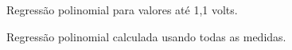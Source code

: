 \documentclass[brazilian,12pt,a4paper,final]{article}
\begin{document}
\begin{figure}[htbp!]
  \caption{Regressão polinomial para valores até 1,1 volts.}
  \label{figiniciopeq}
  \centering
\end{figure}

\begin{figure}[htbp!]
  \caption{Regressão polinomial calculada usando todas as medidas.}
  \label{figiniciogr}
  \centering
\end{figure}
\end{document}
